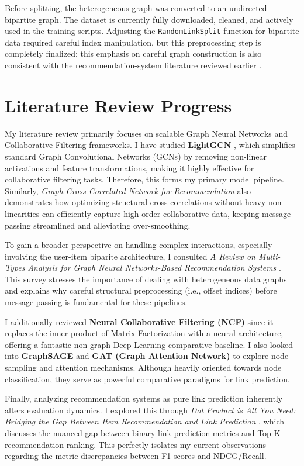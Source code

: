\documentclass[12pt, a4paper]{article}
\begin{document}
Before splitting, the heterogeneous graph was converted to an undirected bipartite graph. The dataset is currently fully downloaded, cleaned, and actively used in the training scripts. Adjusting the \texttt{RandomLinkSplit} function for bipartite data required careful index manipulation, but this preprocessing step is completely finalized; this emphasis on careful graph construction is also consistent with the recommendation-system literature reviewed earlier \cite{shafiq2023review}.

\section{Literature Review Progress}
My literature review primarily focuses on scalable Graph Neural Networks and Collaborative Filtering frameworks. I have studied \textbf{LightGCN} \cite{he2020lightgcn}, which simplifies standard Graph Convolutional Networks (GCNs) by removing non-linear activations and feature transformations, making it highly effective for collaborative filtering tasks. Therefore, this forms my primary model pipeline. Similarly, \textit{Graph Cross-Correlated Network for Recommendation} \cite{hu2023graphcross} also demonstrates how optimizing structural cross-correlations without heavy non-linearities can efficiently capture high-order collaborative data, keeping message passing streamlined and alleviating over-smoothing.

To gain a broader perspective on handling complex interactions, especially involving the user-item biparite architecture, I consulted \textit{A Review on Multi-Types Analysis for Graph Neural Networks-Based Recommendation Systems} \cite{shafiq2023review}. This survey stresses the importance of dealing with heterogeneous data graphs and explains why careful structural preprocessing (i.e., offset indices) before message passing is fundamental for these pipelines.

I additionally reviewed \textbf{Neural Collaborative Filtering (NCF)} \cite{he2017neural} since it replaces the inner product of Matrix Factorization with a neural architecture, offering a fantastic non-graph Deep Learning comparative baseline. I also looked into \textbf{GraphSAGE} \cite{hamilton2017inductive} and \textbf{GAT (Graph Attention Network)} \cite{velickovic2018graph} to explore node sampling and attention mechanisms. Although heavily oriented towards node classification, they serve as powerful comparative paradigms for link prediction. 

Finally, analyzing recommendation systems as pure link prediction inherently alters evaluation dynamics. I explored this through \textit{Dot Product is All You Need: Bridging the Gap Between Item Recommendation and Link Prediction} \cite{yuan2024dotproduct}, which discusses the nuanced gap between binary link prediction metrics and Top-K recommendation ranking. This perfectly isolates my current observations regarding the metric discrepancies between F1-scores and NDCG/Recall.
\end{document}
